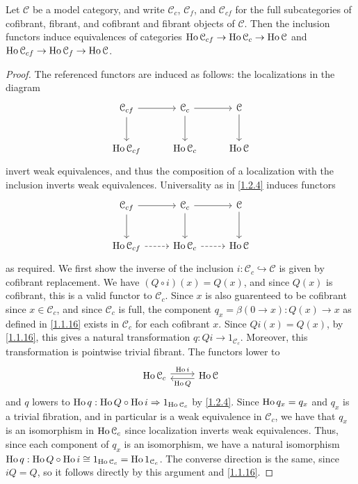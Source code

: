 \begin{proposition}\label{1.2.6}
	Let $\mathcal{C} $ be a model category, and write $\mathcal{C} _c$, $\mathcal{C} _f$, and $\mathcal{C} _{cf} $ for the full subcategories of cofibrant, fibrant, and cofibrant and fibrant objects of $\mathcal{C} $. Then the inclusion functors induce equivalences of categories $\operatorname{Ho} \mathcal{C} _{cf} \to \operatorname{Ho} \mathcal{C} _c\to \operatorname{Ho} \mathcal{C} $ and $\operatorname{Ho} \mathcal{C} _{cf} \to \operatorname{Ho} \mathcal{C} _f\to \operatorname{Ho} \mathcal{C} $.
\end{proposition}
\begin{proof}
	The referenced functors are induced as follows: the localizations in the diagram
	\[\begin{tikzcd}[row sep = 2.5em, column sep = 2.5em]
	\mathcal{C} _{cf}  \ar[d] \ar[r]  & \mathcal{C} _c\ar[d] \ar[r]  & \mathcal{C} \ar[d]  \\
	\Ho \mathcal{C} _{cf}  & \Ho \mathcal{C} _c & \Ho \mathcal{C} 
	\end{tikzcd}\]
	invert weak equivalences, and thus the composition of a localization with the inclusion inverts weak equivalences. Universality as in \cref{1.2.4} induces functors
	\[\begin{tikzcd}[row sep = 2.5em, column sep = 2.5em]
	\mathcal{C} _{cf}  \ar[d] \ar[r]  & \mathcal{C} _c\ar[d] \ar[r]  & \mathcal{C} \ar[d]  \\
	\Ho \mathcal{C} _{cf} \ar[dashed, r]  & \Ho \mathcal{C} _c \ar[dashed, r] & \Ho \mathcal{C} 
	\end{tikzcd}\]
	as required. We first show the inverse of the inclusion $i : \mathcal{C} _c \hookrightarrow \mathcal{C} $ is given by cofibrant replacement. We have $(Q\circ i)(x)=Q(x)$, and since $Q(x)$ is cofibrant, this is a valid functor to $\mathcal{C} _c$. Since $x$ is also guarenteed to be cofibrant since $x\in \mathcal{C} _c$, and since $\mathcal{C} _c$ is full, the component $q_x = \beta(0\to x) : Q(x) \to x$ as defined in \cref{1.1.16} exists in $\mathcal{C} _c$ for each cofibrant $x$. Since $Qi(x)=Q(x)$, by \cref{1.1.16}, this gives a natural transformation $q : Qi \to 1_{\mathcal{C}_c} $. Moreover, this transformation is pointwise trivial fibrant. The functors lower to
	\[\begin{tikzcd}[row sep = 2.5em, column sep = 2.5em]
	\Ho \mathcal{C} _c \ar[" \Ho i ", shift left, r]  & \Ho \mathcal{C} \ar[" \Ho Q ", shift left, l] 
	\end{tikzcd}\]
	and $q$ lowers to $\operatorname{Ho} q : \operatorname{Ho} Q\circ  \operatorname{Ho} i \Rightarrow 1_{\operatorname{Ho} \mathcal{C}_c} $ by \cref{1.2.4}. Since $\operatorname{Ho} q_x=q_x$ and $q_x$ is a trivial fibration, and in particular is a weak equivalence in $\mathcal{C} _c$, we have that $q_x$ is an isomorphism in $\operatorname{Ho} \mathcal{C}_c$ since localization inverts weak equivalences. Thus, since each component of $q_x$ is an isomorphism, we have a natural isomorphism $\operatorname{Ho} q : \operatorname{Ho} Q \circ \operatorname{Ho} i \cong 1_{\operatorname{Ho} \mathcal{C}_c} =\operatorname{Ho} 1_{\mathcal{C}_c } $. The converse direction is the same, since $iQ=Q$, so it follows directly by this argument and \cref{1.1.16}.


\end{proof}
